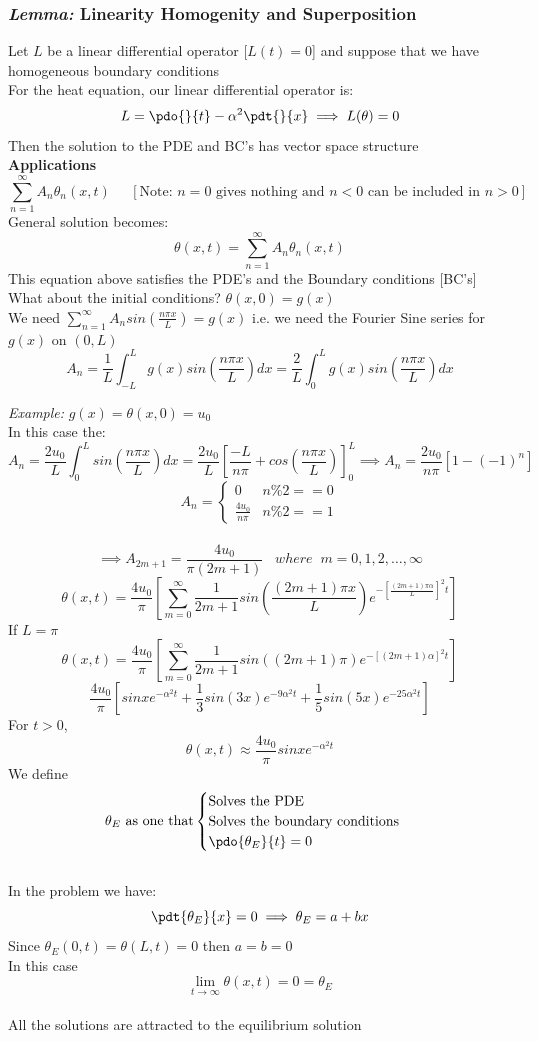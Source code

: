 \documentclass[11pt]{article}
\theoremstyle{definition}
\begin{document}
\subsubsection{\textit{Lemma:} Linearity Homogenity and Superposition}
Let $L$ be a linear differential operator [$L(t) = 0$] and suppose that we have homogeneous boundary conditions\\
For the heat equation, our linear differential operator is:
$$L = \pdo{}{t} - \alpha^2\pdt{}{x} \implies L(\theta) = 0$$
Then the solution to the PDE and BC's has vector space structure\\
\textbf{Applications}\\
$$\sum^\infty_{n=1}A_n\theta_n(x,t) \;\;\;\;\; [\text{Note: } n = 0 \text{ gives nothing and } n < 0 \text{ can be included in } n>0]$$
General solution becomes:
$$\theta(x,t) = \sum^\infty_{n=1}A_n\theta_n(x,t)$$
This equation above satisfies the PDE's and the Boundary conditions [BC's]
What about the initial conditions?
$\theta(x,0) = g(x)$\\
We need $\sum^\infty_{n = 1}A_nsin(\frac{n\pi x}{L}) = g(x)$ i.e. we need the Fourier Sine series for $g(x)$ on $(0,L)$
$$A_n = \frac{1}{L}\int^L_{-L} g(x) sin(\frac{n\pi x}{L}) dx = \frac{2}{L}\int^L_0 g(x) sin(\frac{n\pi x}{L}) dx$$

\textit{Example:} $g(x) = \theta(x,0) = u_0$\\
In this case the:
$$A_n = \frac{2u_0}{L}\int^L_0sin(\frac{n\pi x}{L}) dx =  \frac{2u_0}{L} [\frac{-L}{n\pi} + cos(\frac{n\pi x}{L})]_0^L \implies A_n = \frac{2u_0}{n\pi}[1-(-1)^n]$$
\[A_n =  \begin{cases}
      0 & n\%2 == 0 \\
      \frac{4u_0}{n\pi} & n\%2 == 1
   \end{cases}
\]\\
$$\implies A_{2m+1} = \frac{4u_0}{\pi(2m + 1)}\;\; \;where\;\; m = 0,1,2,\dots,\infty$$
$$\theta(x,t) = \frac{4u_0}{\pi}[\sum^\infty_{m=0}\frac{1}{2m+1}sin(\frac{(2m+1)\pi x}{L})e^{-[{\frac{(2m+1)\pi \alpha}{L}}]^2t}]$$
If $L = \pi$
$$\theta(x,t) = \frac{4u_0}{\pi}[\sum^\infty_{m=0}\frac{1}{2m+1}sin((2m+1)\pi)e^{-[(2m+1) \alpha]^2t}]$$
$$\frac{4u_0}{\pi} [sinx e^{-\alpha^2 t} + \frac{1}{3}sin(3x) e^{-9\alpha^2 t} + \frac{1}{5}sin(5x) e^{-25\alpha^2 t}]$$
For $t>0$,
$$\theta(x,t) \approx \frac{4u_0}{\pi} sinx e^{-\alpha^2 t}$$
We define
\[\theta_E \text{ as one that}  \begin{cases}
      \text{Solves the PDE} \\
      \text{Solves the boundary conditions} \\
       \pdo{\theta_E}{t} = 0\\
   \end{cases}
\]\\
In the problem we have:
$$\pdt{\theta_E}{x} = 0 \implies \theta_E = a + bx $$
Since $\theta_E(0,t) = \theta(L,t) = 0$ then $a = b  = 0$ \\
In this case $$\lim_{t \to \infty} \theta(x,t) = 0 = \theta_E$$\\
All the solutions are attracted to the equilibrium solution
\end{document}
